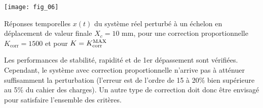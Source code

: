 \begin{center}%

\iflivret
\begin{marginfigure}
\texttt{[image: fig\_06]}
\caption{{ Réponses temporelles $x(t)$ du système réel perturbé à un échelon en déplacement de valeur finale $X_c = 10$ mm, pour une correction proportionnelle $K_{\text{corr}} = \num{1500}$ et pour $K = K_{\text{corr}}^{\text{\text{MAX}}}$}
\label{fig:reponse_kcorr_kcorrmax}}
\end{marginfigure}
\else
\fi

\end{center}
\fi

\ifprof
\begin{corrige}
Les performances de stabilité, rapidité et de 1er dépassement sont vérifiées. Cependant, le système avec correction proportionnelle n'arrive pas à atténuer suffisamment la perturbation (l'erreur est de l'ordre de 15 à 20$\%$ bien supérieure au 5$\%$ du cahier des charges). Un autre type de correction doit donc être envisagé pour satisfaire l'ensemble des critères.\end{corrige}
\fi


